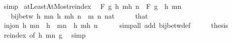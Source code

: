 \begin{isabellebody}
\ simp\isanewline
{}\isamarkupfalse%
%
\endisatagproof
{\isafoldproof}%
%
\isadelimproof
\isanewline
%
\endisadelimproof
\isanewline
{}\isamarkupfalse%
\ atLeastAtMost{\isacharunderscore}{\kern0pt}reindex{\isacharcolon}{\kern0pt}\isanewline
\ \ {\isachardoublequoteopen}F\ g\ {\isacharbraceleft}{\kern0pt}h\ m{\isachardot}{\kern0pt}{\isachardot}{\kern0pt}h\ n{\isacharbraceright}{\kern0pt}\ {\isacharequal}{\kern0pt}\ F\ {\isacharparenleft}{\kern0pt}g\ {\isasymcirc}\ h{\isacharparenright}{\kern0pt}\ {\isacharbraceleft}{\kern0pt}m{\isachardot}{\kern0pt}{\isachardot}{\kern0pt}n{\isacharbraceright}{\kern0pt}{\isachardoublequoteclose}\isanewline
\ \ \ {\isachardoublequoteopen}bij{\isacharunderscore}{\kern0pt}betw\ h\ {\isacharbraceleft}{\kern0pt}m{\isachardot}{\kern0pt}{\isachardot}{\kern0pt}n{\isacharbraceright}{\kern0pt}\ {\isacharbraceleft}{\kern0pt}h\ m{\isachardot}{\kern0pt}{\isachardot}{\kern0pt}h\ n{\isacharbraceright}{\kern0pt}{\isachardoublequoteclose}\ \ m\ n\ {\isacharcolon}{\kern0pt}{\isacharcolon}{\kern0pt}nat\isanewline
%
\isadelimproof
%
\endisadelimproof
%
\isatagproof
{}\isamarkupfalse%
\ {\isacharminus}{\kern0pt}\isanewline
\ \ \isamarkupfalse%
\ that\ \isamarkupfalse%
\ {\isachardoublequoteopen}inj{\isacharunderscore}{\kern0pt}on\ h\ {\isacharbraceleft}{\kern0pt}m{\isachardot}{\kern0pt}{\isachardot}{\kern0pt}n{\isacharbraceright}{\kern0pt}{\isachardoublequoteclose}\ \ {\isachardoublequoteopen}h\ {\isacharbackquote}{\kern0pt}\ {\isacharbraceleft}{\kern0pt}m{\isachardot}{\kern0pt}{\isachardot}{\kern0pt}n{\isacharbraceright}{\kern0pt}\ {\isacharequal}{\kern0pt}\ {\isacharbraceleft}{\kern0pt}h\ m{\isachardot}{\kern0pt}{\isachardot}{\kern0pt}h\ n{\isacharbraceright}{\kern0pt}{\isachardoublequoteclose}\isanewline
\ \ \ \ \isamarkupfalse%
\ {\isacharparenleft}{\kern0pt}simp{\isacharunderscore}{\kern0pt}all\ add{\isacharcolon}{\kern0pt}\ bij{\isacharunderscore}{\kern0pt}betw{\isacharunderscore}{\kern0pt}def{\isacharparenright}{\kern0pt}\isanewline
\ \ \isamarkupfalse%
\ \isamarkupfalse%
\ {\isacharquery}{\kern0pt}thesis\isanewline
\ \ \ \ \isamarkupfalse%
\ reindex\ {\isacharbrackleft}{\kern0pt}of\ h\ {\isachardoublequoteopen}{\isacharbraceleft}{\kern0pt}m{\isachardot}{\kern0pt}{\isachardot}{\kern0pt}n{\isacharbraceright}{\kern0pt}{\isachardoublequoteclose}\ g{\isacharbrackright}{\kern0pt}\ \isamarkupfalse%
\ simp\isanewline
{}\isamarkupfalse%

\end{isabellebody}
